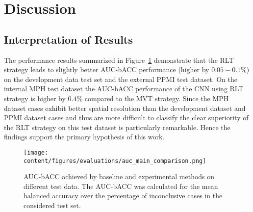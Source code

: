 \section{Discussion}
\label{sec:discussion}

\subsection{Interpretation of Results}

The performance results summarized in Figure~\ref{fig:auc_comparison_methods_data} demonstrate 
that the RLT strategy leads to slightly better AUC-bACC performance (higher by $0.05-0.1\%$) on the development data test set 
and the external PPMI test dataset.
On the internal MPH test dataset the AUC-bACC performance of the CNN using RLT strategy is higher by $0.4\%$ compared to the MVT strategy.
Since the MPH dataset cases exhibit better spatial resolution than the development dataset and PPMI dataset cases
and thus are more difficult to classify 
the clear superiority of the RLT strategy on this test dataset is particularly remarkable.
Hence the findings support the primary hypothesis of this work.

\begin{figure}[ht]
    \centering
    \texttt{[image: content/figures/evaluations/auc\_main\_comparison.png]}
    \caption{AUC-bACC achieved by baseline and experimental methods on different test data. 
    The AUC-bACC was calculated for the mean balanced accuracy over the percentage of inconclusive cases 
    in the considered test set.} 
    \label{fig:auc_comparison_methods_data}
\end{figure} 


